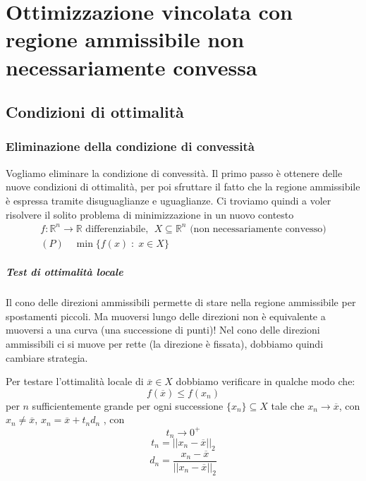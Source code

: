 

\inbpdocument 


\chapter{Ottimizzazione vincolata con regione  ammissibile  non necessariamente convessa}

\section{Condizioni di ottimalit\`a}
\subsection{Eliminazione della  condizione di convessit\`a}
Vogliamo eliminare la condizione di convessit\`a.
Il primo passo \`e ottenere delle nuove condizioni di ottimalit\`a,
per poi sfruttare il fatto che la regione ammissibile \`e espressa
tramite disuguaglianze e uguaglianze.
Ci troviamo quindi a voler risolvere il solito problema di minimizzazione
in un nuovo contesto
$$
\begin{array}{c}
f: \mathbb{R}^{n}\rightarrow \mathbb{R} \text{ differenziabile, }
\; X \subseteq \mathbb{R}^{n} \text{ (non necessariamente convesso)} \\
 (P) \quad \min \{ f(x) \; : \; x \in X \}
\end{array}
$$
\paragraph{Test di ottimalit\`a locale}
Il cono delle direzioni ammissibili permette di stare nella regione
ammissibile per spostamenti piccoli. Ma muoversi lungo delle
direzioni non \`e equivalente a muoversi a una curva (una successione
di punti)!  Nel cono delle direzioni ammissibili ci si muove per rette
(la direzione \`e fissata), dobbiamo quindi cambiare strategia.

\begin{center}
\fbox
{
	\begin{minipage}[position]{0.85\textwidth}
Per testare l'ottimalit\`a locale  di $\overline{x} \in X$
dobbiamo verificare in qualche modo che:
$$ f(\overline{x}) \leq f(x_n) $$
per $n$ sufficientemente grande per ogni successione
$\{x_n\} \subseteq X$ tale che $x_n \to \overline{x}$, con
 $x_n \neq \overline{x}$,
$x_n = \overline{x}+t_n d_n$ , con
$$ t_n \rightarrow 0^{+} $$
$$ t_n = ||x_n - \overline{x}||_2$$
$$ d_n = \dfrac{x_n - \overline{x}}{||x_n - \overline{x}||_2}$$
\end{minipage}
}
\end{center}


